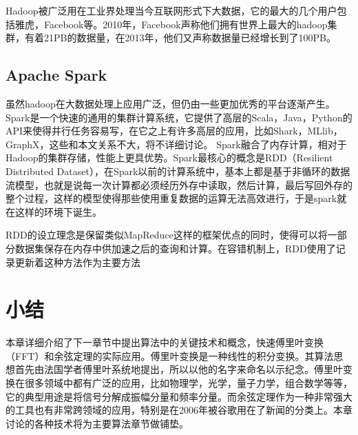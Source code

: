 Hadoop被广泛用在工业界处理当今互联网形式下大数据，它的最大的几个用户包括雅虎，Facebook等。2010年，Facebook声称他们拥有世界上最大的hadoop集群，有着21PB的数据量，在2013年，他们又声称数据量已经增长到了100PB。

\subsection{Apache Spark}
虽然hadoop在大数据处理上应用广泛，但仍由一些更加优秀的平台逐渐产生。
Spark是一个快速的通用的集群计算系统，它提供了高层的Scala，Java，Python的API来使得并行任务容易写，在它之上有许多高层的应用，比如Shark，MLlib，GraphX，这些和本文关系不大，将不详细讨论。
Spark融合了内存计算，相对于Hadoop的集群存储，性能上更具优势。Spark最核心的概念是RDD（Resilient Distributed Dataset），在Spark以前的计算系统中，基本上都是基于非循环的数据流模型，也就是说每一次计算都必须经历外存中读取，然后计算，最后写回外存的整个过程，这样的模型使得那些使用重复数据的运算无法高效进行，于是spark就在这样的环境下诞生。

RDD的设立理念是保留类似MapReduce这样的框架优点的同时，使得可以将一部分数据集保存在内存中供加速之后的查询和计算。在容错机制上，RDD使用了记录更新着这种方法作为主要方法
\section{小结}
\label{sec:conc}

本章详细介绍了下一章节中提出算法中的关键技术和概念，快速傅里叶变换（FFT）和余弦定理的实际应用。傅里叶变换是一种线性的积分变换。其算法思想首先由法国学者傅里叶系统地提出，所以以他的名字来命名以示纪念。傅里叶变换在很多领域中都有广泛的应用，比如物理学，光学，量子力学，组合数学等等，它的典型用途是将信号分解成振幅分量和频率分量。而余弦定理作为一种非常强大的工具也有非常跨领域的应用，特别是在2006年被谷歌用在了新闻的分类上。本章讨论的各种技术将为主要算法章节做铺垫。

